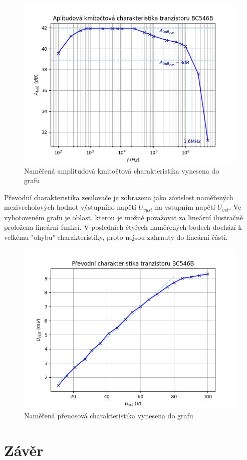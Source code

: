 \documentclass[a4paper, czech]{article}
\begin{document}
\begin{figure}[H]
    \centering
    \includegraphics{akch.png}
    \caption{Naměřená amplitudová kmitočtová charakteristika vynesena do grafu}
\end{figure}

Převodní charakteristika zesilovače je zobrazena jako závislost naměřených mezivrcholových hodnot výstupního napětí $U_{vyst}$ na vstupním napětí $U_{vst}$.
Ve vyhotoveném grafu je oblast, kterou je možné považovat za lineární ilustračně proložena lineární funkcí.
V posledních čtyřech naměŕených bodech dochází k velkému "ohybu" charakteristiky, proto nejsou zahrnuty do lineární části.

\begin{figure}[H]
    \centering
    \includegraphics{pch.png}
    \caption{Naměřená přenosová charakteristika vynesena do grafu}
\end{figure}

\section{Závěr}
\end{document}
